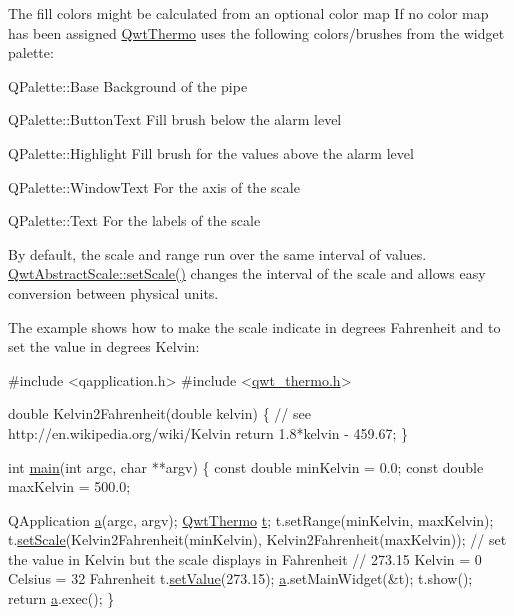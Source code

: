 The fill colors might be calculated from an optional color map If no color map has been assigned \hyperlink{class_qwt_thermo}{Qwt\-Thermo} uses the following colors/brushes from the widget palette\-:


\begin{DoxyItemize}
\item Q\-Palette\-::\-Base Background of the pipe
\item Q\-Palette\-::\-Button\-Text Fill brush below the alarm level
\item Q\-Palette\-::\-Highlight Fill brush for the values above the alarm level
\item Q\-Palette\-::\-Window\-Text For the axis of the scale
\item Q\-Palette\-::\-Text For the labels of the scale
\end{DoxyItemize}

By default, the scale and range run over the same interval of values. \hyperlink{class_qwt_abstract_scale_a91af529248b556ef130add4bcfc60bb2}{Qwt\-Abstract\-Scale\-::set\-Scale()} changes the interval of the scale and allows easy conversion between physical units.

The example shows how to make the scale indicate in degrees Fahrenheit and to set the value in degrees Kelvin\-: 
\begin{DoxyCode}
\textcolor{preprocessor}{#include <qapplication.h>}
\textcolor{preprocessor}{#include <\hyperlink{qwt__thermo_8h}{qwt\_thermo.h}>}

\textcolor{keywordtype}{double} Kelvin2Fahrenheit(\textcolor{keywordtype}{double} kelvin)
\{
    \textcolor{comment}{// see http://en.wikipedia.org/wiki/Kelvin}
    \textcolor{keywordflow}{return} 1.8*kelvin - 459.67;
\}

\textcolor{keywordtype}{int} \hyperlink{gcs_2src_2app_2main_8cpp_a3c04138a5bfe5d72780bb7e82a18e627}{main}(\textcolor{keywordtype}{int} argc, \textcolor{keywordtype}{char} **argv)
\{
    \textcolor{keyword}{const} \textcolor{keywordtype}{double} minKelvin = 0.0;
    \textcolor{keyword}{const} \textcolor{keywordtype}{double} maxKelvin = 500.0;

    QApplication \hyperlink{glext_8h_ac8729153468b5dcf13f971b21d84d4e5}{a}(argc, argv);
    \hyperlink{class_qwt_thermo}{QwtThermo} \hyperlink{glext_8h_a00140d6f5c548b26daf170bf16e86a6d}{t};
    t.setRange(minKelvin, maxKelvin);
    t.\hyperlink{class_qwt_abstract_scale_a91af529248b556ef130add4bcfc60bb2}{setScale}(Kelvin2Fahrenheit(minKelvin), Kelvin2Fahrenheit(maxKelvin));
    \textcolor{comment}{// set the value in Kelvin but the scale displays in Fahrenheit}
    \textcolor{comment}{// 273.15 Kelvin = 0 Celsius = 32 Fahrenheit}
    t.\hyperlink{class_qwt_thermo_ad54ebf4761c12f948d09cd45a26d1fd4}{setValue}(273.15);
    \hyperlink{glext_8h_ac8729153468b5dcf13f971b21d84d4e5}{a}.setMainWidget(&t);
    t.show();
    \textcolor{keywordflow}{return} \hyperlink{glext_8h_ac8729153468b5dcf13f971b21d84d4e5}{a}.exec();
\}
\end{DoxyCode}


